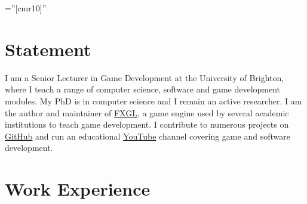 \documentclass[a4paper,11pt]{article} %
\begin{document}
\pagestyle{empty} %

\font\fb=''[cmr10]'' %


\par{\bigskip\par} %

\section{Statement}

I am a Senior Lecturer in Game Development at the University of Brighton, where I teach a range of computer science, software and game development modules.
My PhD is in computer science and I remain an active researcher.
I am the author and maintainer of \href{https://github.com/AlmasB/FXGL}{FXGL}, a game engine used by several academic institutions to teach game development.
I contribute to numerous projects on \href{https://github.com/AlmasB}{GitHub} and run an educational \href{https://www.youtube.com/almasb0/videos}{YouTube} channel covering game and software development.


\section{Work Experience}
\end{document}
